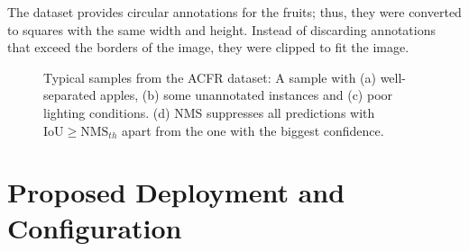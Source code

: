 The dataset provides circular annotations for the fruits; thus, they were converted to squares with the same width and height. Instead of discarding annotations that exceed the borders of the image, they were clipped to fit the image.
 
 \begin{figure}[!htb]
  \centering
  
  \caption{Typical samples from the ACFR dataset: A sample with (a) well-separated apples, (b) some unannotated instances and 
  		(c) poor lighting conditions. (d) NMS suppresses all predictions with $\text{IoU}\geq\text{NMS}_{th}$ apart from the one with the biggest confidence.}
  \label{fig1}
\end{figure}
 
\section{Proposed Deployment and Configuration}
